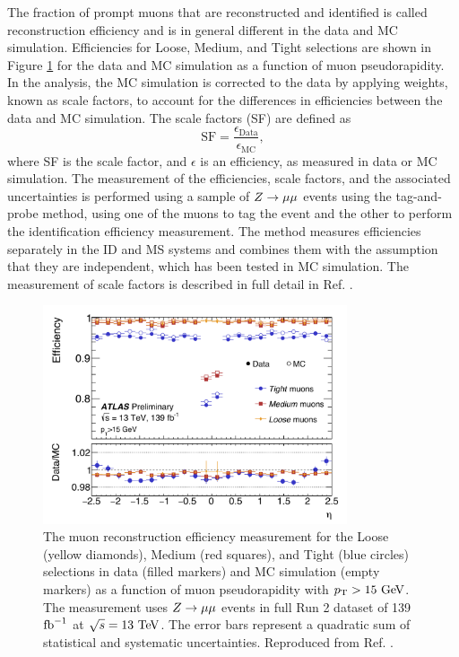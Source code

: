 The fraction of prompt muons that are reconstructed and identified
is called reconstruction efficiency and is in general different
in the data and MC simulation. Efficiencies for Loose, Medium, and Tight
selections are shown in Figure \ref{fig:muon:reco_eff} for the data and
MC simulation as a function of muon pseudorapidity. In the analysis,
the MC simulation is corrected to the data by applying weights, known as
scale factors, to account for the differences in efficiencies between
the data and MC simulation. The scale factors (SF) are defined as
\begin{equation}
\text{SF} = \frac{\epsilon_\text{Data}}{\epsilon_\text{MC}},
\end{equation}
where SF is the scale factor, and $\epsilon$ is an efficiency,
as measured in data or MC simulation. The measurement of the
efficiencies, scale factors, and the associated
uncertainties is performed using a sample of $Z \rightarrow \mu\mu$ events using the
tag-and-probe method, using one of the muons to tag the event and the other
to perform the identification efficiency measurement. The method measures
efficiencies separately in the ID and MS systems and combines them
with the assumption that they are independent, which has been tested in MC simulation.
The measurement of scale factors is described in full detail in Ref. \cite{Aad:2016jkr}.

\begin{figure}[h]
  \centering
  \includegraphics[width=0.8\textwidth]{figures/muons/reco_eff}
  \caption[Muon reconstruction efficiency]{The muon reconstruction
  efficiency measurement for the Loose (yellow diamonds), Medium
  (red squares), and Tight (blue circles) selections in data
  (filled markers) and MC simulation (empty markers) as a function
  of muon pseudorapidity with $p_{\text{T}} > 15~\text{Ge\kern -0.1em V}$. The measurement
  uses $Z \rightarrow \mu\mu$ events in full Run 2 dataset of 139 $\text{fb}^{-1}$
  at $\sqrt{s}=13~\text{Te\kern -0.1em V}$. The error bars represent a quadratic sum of
  statistical and systematic uncertainties. Reproduced from Ref.
  \cite{Junggeburth:2685295}.}
  \label{fig:muon:reco_eff}
\end{figure}

